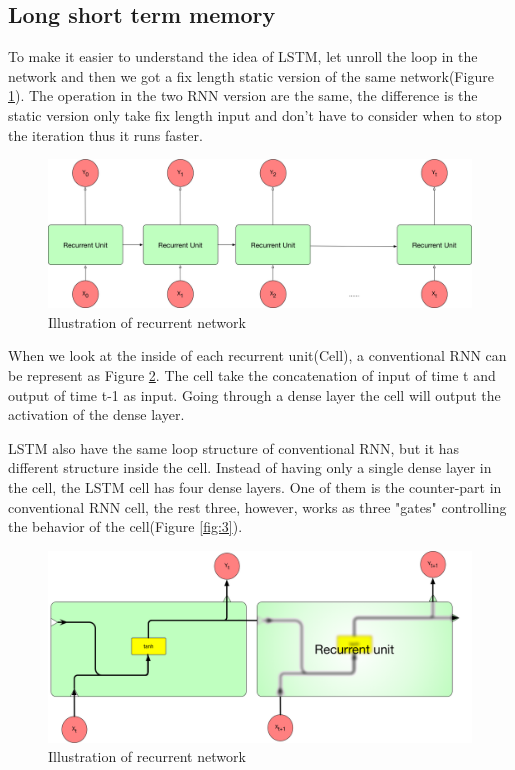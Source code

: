 \subsection{Long short term memory}
To make it easier to understand the idea of LSTM, let unroll the loop in the network and then we got a fix length static version of the same network(Figure \ref{fig:1}). The operation in the two RNN version are the same, the difference is the static version only take fix length input and don't have to consider when to stop the iteration thus it runs faster.\par
\begin{figure}[h] 
	\centering
	\includegraphics[width=6.0in]{Figures/recurrent2}
	\caption[unrolled recurrent network]{Illustration of recurrent network}
	\label{fig:1}
\end{figure}

When we look at the inside of each recurrent unit(Cell), a conventional RNN can be represent as Figure \ref{fig:2}. The cell take the concatenation of input of time t and output of time t-1 as input. Going through a dense layer the cell will output the activation of the dense layer.\par  

LSTM also have the same loop structure of conventional RNN, but it has different structure inside the cell. Instead of having only a single dense layer in the cell, the LSTM cell has four dense layers. One of them is the counter-part in conventional RNN cell, the rest three, however, works as three "gates" controlling the behavior of the cell(Figure \ref{fig:3}).\par 


\begin{figure}[h] 
	\centering
	\includegraphics[width=6.0in]{Figures/recurrent3}
	\caption[Detail inside recurrent unit]{Illustration of recurrent network}
	\label{fig:2}
\end{figure}

